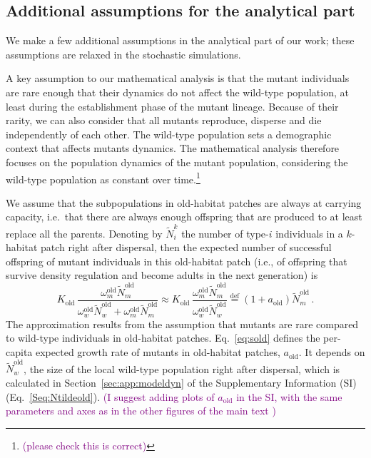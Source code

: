 \documentclass[11pt]{article}
\newcommand{\florence}[1]{\textcolor{purple}{(#1)}} %
\begin{document}
\subsection*{Additional assumptions for the analytical part}
We make a few additional assumptions in the analytical part of our work; these assumptions are relaxed in the stochastic simulations. 

A key assumption to our mathematical analysis is that the mutant individuals are rare enough that their dynamics do not affect the wild-type population, at least during the establishment phase of the mutant lineage. Because of their rarity, we can also consider that all mutants reproduce, disperse and die independently of each other. 
The wild-type population sets a demographic context that affects mutants dynamics. The mathematical analysis therefore focuses on the population dynamics of the mutant population, considering the wild-type population as constant over time.\footnote{\florence{please check this is correct}}

We assume that the subpopulations in old-habitat patches are always at carrying capacity, i.e.\ that there are always enough offspring that are produced to at least replace all the parents. Denoting by $\widetilde{N}_{i}^{k}$ the number of type-$i$ individuals in a $k$-habitat patch right after dispersal, then the expected number of successful offspring of mutant individuals in this old-habitat patch (i.e., of offspring that survive density regulation and become adults in the next generation) is 
%
\begin{equation}\label{eq:sold}
K_{\text{old}}\, \frac{\omega^\text{old}_m \widetilde{N}^{\text{old}}_m}{\omega^\text{old}_w \widetilde{N}^{\text{old}}_w + \omega^\text{old}_m \widetilde{N}^{\text{old}}_m}
%
\approx K_{\text{old}}\, \frac{\omega^\text{old}_m \widetilde{N}^{\text{old}}_m}{\omega^\text{old}_w \widetilde{N}^{\text{old}}_w} 
%
\overset{\mathrm{def}}{=} \left(1 + a_{\text{old}}\right) \widetilde{N}^{\text{old}}_m \, .
\end{equation}
%
The approximation results from the assumption that mutants are rare compared to wild-type individuals in old-habitat patches. Eq.~\eqref{eq:sold} defines the per-capita expected growth rate of mutants in old-habitat patches, $a_{\text{old}}$. It depends on $\widetilde{N}^{\text{old}}_w$, the size of the local wild-type population right after dispersal, which is calculated in Section~\ref{sec:app:modeldyn} of the Supplementary Information (SI) (Eq.~\eqref{Seq:Ntildeold}). \florence{I suggest adding plots of $a_{\text{old}}$ in the SI, with the same parameters and axes as in the other figures of the main text }
\end{document}

